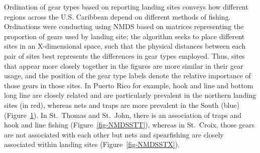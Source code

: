 \documentclass[
  letterpaper,
  oneside,
  open=any]{scrbook}
\begin{document}
Ordination of gear types based on reporting landing sites conveys how
different regions across the U.S. Caribbean depend on different methods
of fishing. Ordinations were conducting using NMDS based on matrices
representing the proportion of gears used by landing site; the algorithm
seeks to place different sites in an X-dimensional space, such that the
physical distances between each pair of sites best represents the
differences in gear types employed. Thus, sites that appear more closely
together in the figures are more similar in their gear usage, and the
position of the gear type labels denote the relative importance of those
gears in those sites. In Puerto Rico for example, hook and line and
bottom long line are closely related and are particularly prevalent in
the northern landing sites (in red), whereas nets and traps are more
prevalent in the South (blue) (Figure~\ref{fig-NMDSPR}). In St.~Thomas
and St.~John, there is an association of traps and hook and line fishing
(Figure~\ref{fig-NMDSSTT}), whereas in St.~Croix, those gears are not
associated with each other but nets and spearfishing are closely
associated within landing sites (Figure~\ref{fig-NMDSSTX}).

\begin{figure}


\caption{\label{fig-NMDSPR}}

\end{figure}%
\end{document}
